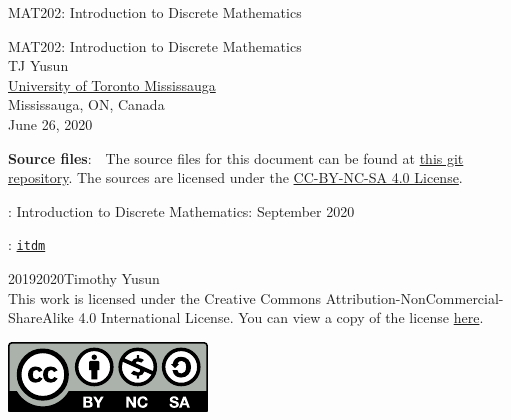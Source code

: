 \documentclass[oneside,10pt,]{book}
\newcommand{\titlepagefont}{\relax}
\newcommand{\mono}[1]{\texttt{#1}}
\numberwithin{equation}{section}
\begin{document}
\frontmatter
\thispagestyle{empty}
{\titlepagefont\centering
\vspace*{0.28\textheight}
{\Huge MAT202: Introduction to Discrete Mathematics}\\}
\clearpage
\thispagestyle{empty}
\null%
\clearpage
\thispagestyle{empty}
{\titlepagefont\centering
\vspace*{0.14\textheight}
{\Huge MAT202: Introduction to Discrete Mathematics}\\[3\baselineskip]
{\Large TJ Yusun}\\[0.5\baselineskip]
{\Large \href{https://www.utm.utoronto.ca/}{University of Toronto Mississauga}\\
Mississauga, ON, Canada}\\[3\baselineskip]
{\Large June 26, 2020}\\}
\clearpage
\thispagestyle{empty}
\hypertarget{x:colophon:colophon}{}
\par\noindent
\textbf{Source files}:\ \ The source files for this document can be found at \href{http://github.com/}{this git repository}. The sources are licensed under the \href{http://creativecommons.org/licenses/by-nc-sa/4.0/}{CC-BY-NC-SA 4.0 License}.
\par{}
: Introduction to Discrete Mathematics: September 2020\par\medskip
{}: \href{https:\slash{}\slash{}tjyusun.com\slash{}}{\mono{itdm}}\par\medskip
\noindent\textcopyright{}2019\textendash{}2020\quad{}Timothy Yusun\\[0.5\baselineskip]
This work is licensed under the Creative Commons Attribution-NonCommercial-ShareAlike 4.0 International License. You can view a copy of the license \href{http://creativecommons.org/licenses/by-nc-sa/4.0/}{here}. \begin{image}{0.375}{0.25}{0.375}%
\includegraphics[width=\linewidth]{figs/by-nc-sa}
\end{image}%
\end{document}
